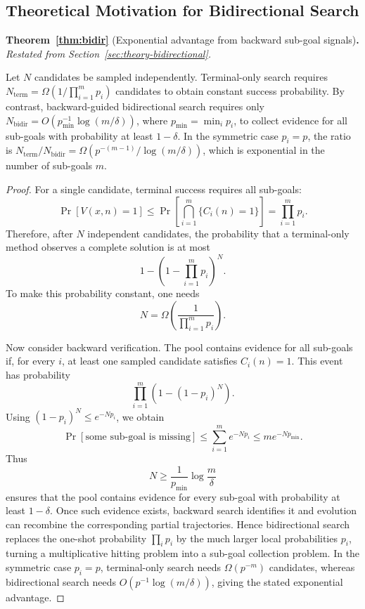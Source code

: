 \subsection{Theoretical Motivation for Bidirectional Search}
\label{app:theory-bidirectional}

\noindent\textbf{Theorem~\ref{thm:bidir}} (Exponential advantage from backward sub-goal signals)\textbf{.}
\textit{Restated from Section~\ref{sec:theory-bidirectional}.}
\medskip

\noindent Let $N$ candidates be sampled independently. Terminal-only search requires
$N_{\mathrm{term}} = \Omega\!\left(1 / \prod_{i=1}^m p_i\right)$
candidates to obtain constant success probability. By contrast, backward-guided bidirectional search requires only
$N_{\mathrm{bidir}} = O\!\left(p_{\min}^{-1}\log(m/\delta)\right)$,
where $p_{\min}=\min_i p_i$,
to collect evidence for all sub-goals with probability at least $1-\delta$. In the symmetric case $p_i=p$, the ratio is
$N_{\mathrm{term}} / N_{\mathrm{bidir}} = \Omega\!\left(p^{-(m-1)} / \log(m/\delta)\right)$,
which is exponential in the number of sub-goals $m$.

\begin{proof}
For a single candidate, terminal success requires all sub-goals:
\[
  \Pr[V(x,n)=1]
  \le
  \Pr\!\left[\bigcap_{i=1}^m \{C_i(n)=1\}\right]
  =
  \prod_{i=1}^m p_i.
\]
Therefore, after \(N\) independent candidates, the probability that a
terminal-only method observes a complete solution is at most
\[
  1-\left(1-\prod_{i=1}^m p_i\right)^N.
\]
To make this probability constant, one needs
\[
  N=\Omega\!\left(\frac{1}{\prod_{i=1}^m p_i}\right).
\]

Now consider backward verification. The pool contains evidence for all
sub-goals if, for every \(i\), at least one sampled candidate satisfies
\(C_i(n)=1\). This event has probability
\[
  \prod_{i=1}^m \left(1-(1-p_i)^N\right).
\]
Using \((1-p_i)^N\le e^{-Np_i}\), we obtain
\[
  \Pr[\text{some sub-goal is missing}]
  \le
  \sum_{i=1}^m e^{-Np_i}
  \le
  m e^{-N p_{\min}}.
\]
Thus
\[
  N\ge \frac{1}{p_{\min}}\log\frac{m}{\delta}
\]
ensures that the pool contains evidence for every sub-goal with probability at
least \(1-\delta\). Once such evidence exists, backward search identifies it
and evolution can recombine the corresponding partial trajectories. Hence
bidirectional search replaces the one-shot probability
\(\prod_i p_i\) by the much larger local probabilities \(p_i\), turning a
multiplicative hitting problem into a sub-goal collection problem. In the
symmetric case \(p_i=p\), terminal-only search needs
\(\Omega(p^{-m})\) candidates, whereas bidirectional search needs
\(O(p^{-1}\log(m/\delta))\), giving the stated exponential advantage.
\end{proof}

